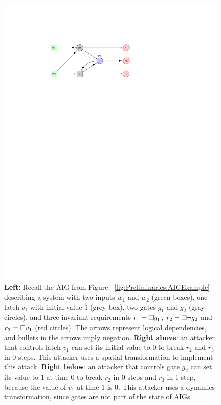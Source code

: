 \begin{figure}[!t]
\begin{minipage}{0.35\textwidth}
\begin{framed}
	\includegraphics[width=\textwidth]{Attack1.pdf}
	\end{framed}
	\end{minipage}
	\caption{\textbf{Left:} Recall the AIG from Figure ~\ref{fig:Preliminaries:AIGExample} describing a system with two
	inputs $w_1$ and $w_2$ (green boxes), one latch $v_1$ with initial value 1 (grey box), two gates $g_1$ and $g_2$ (gray circles), and three invariant requirements $r_1={{\square}} g_1$, $r_2={{\square}} \lnot g_2$ and $r_3={{\square}} v_1$ (red circles). 
	The arrows represent logical dependencies, and bullets in the arrows imply negation.
	\textbf{Right above}: an attacker that controls latch $v_1$ can set its initial value to 0 to break $r_2$ and $r_3$ in 0 steps. This attacker uses a spatial transformation to implement this attack.
	\textbf{Right below}: an attacker that controls gate $g_2$ can set its value to 1 at time 0 to break $r_2$ in 0 steps and $r_3$ in 1 step, because the value of $v_1$ at time 1 is 0. This attacker uses a dynamics transformation, since gates are not part of the state of AIGs.}%
	\label{fig:Classification:Example}
	\end{figure}
